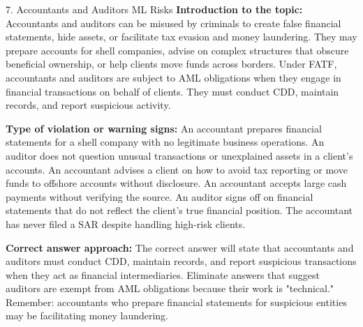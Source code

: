 \documentclass[11pt,a4paper]{beamer}
\begin{document}
\begin{frame}{7. Accountants and Auditors ML Risks}
\tiny
\noindent\textbf{Introduction to the topic:} Accountants and auditors can be misused by criminals to create false financial statements, hide assets, or facilitate tax evasion and money laundering. They may prepare accounts for shell companies, advise on complex structures that obscure beneficial ownership, or help clients move funds across borders. Under FATF, accountants and auditors are subject to AML obligations when they engage in financial transactions on behalf of clients. They must conduct CDD, maintain records, and report suspicious activity.

\vspace{0.1cm}
\noindent\textbf{Type of violation or warning signs:} An accountant prepares financial statements for a shell company with no legitimate business operations. An auditor does not question unusual transactions or unexplained assets in a client's accounts. An accountant advises a client on how to avoid tax reporting or move funds to offshore accounts without disclosure. An accountant accepts large cash payments without verifying the source. An auditor signs off on financial statements that do not reflect the client's true financial position. The accountant has never filed a SAR despite handling high-risk clients.

\vspace{0.1cm}
\noindent\textbf{Correct answer approach:} The correct answer will state that accountants and auditors must conduct CDD, maintain records, and report suspicious transactions when they act as financial intermediaries. Eliminate answers that suggest auditors are exempt from AML obligations because their work is "technical." Remember: accountants who prepare financial statements for suspicious entities may be facilitating money laundering.
\end{frame}
\end{document}
